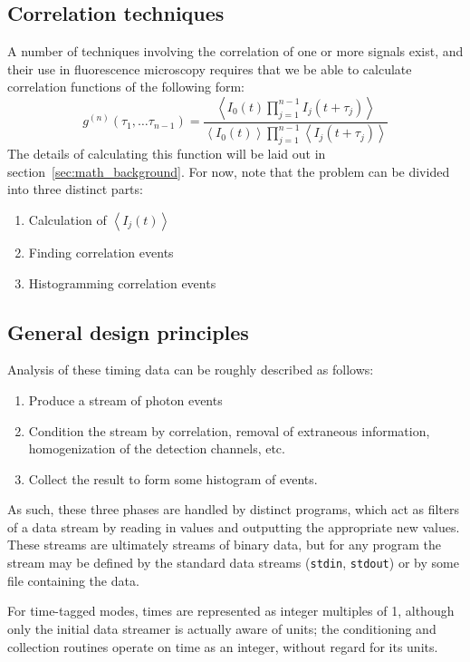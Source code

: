 \documentclass{article}
\newcommand{\angles}[1]{\ensuremath{\left\langle #1 \right\rangle}}
\newcommand{\stdin}{\texttt{stdin}}
\newcommand{\stdout}{\texttt{stdout}}
\newcommand{\gn}[1]{\ensuremath{g^{(#1)}}}
\begin{document}
\subsection{Correlation techniques}
A number of techniques involving the correlation of one or more signals exist, and their use in fluorescence microscopy requires that we be able to calculate correlation functions of the following form:
\begin{equation}
\gn{n}(\tau_{1}, \ldots \tau_{n-1}) = \frac
	{\angles{I_{0}(t)\prod_{j=1}^{n-1}{I_{j}(t+\tau_{j})}}}
	{\angles{I_{0}(t)}\prod_{j=1}^{n-1}{\angles{I_{j}(t+\tau_{j})}}}
\end{equation}
The details of calculating this function will be laid out in section~\ref{sec:math_background}. For now, note that the problem can be divided into three distinct parts:
\begin{enumerate}
\item Calculation of \angles{I_{j}(t)}
\item Finding correlation events
\item Histogramming correlation events
\end{enumerate}

\subsection{General design principles}
Analysis of these timing data can be roughly described as follows:
\begin{enumerate}
\item Produce a stream of photon events
\item Condition the stream by correlation, removal of extraneous information, homogenization of the detection channels, etc.
\item Collect the result to form some histogram of events.
\end{enumerate}
As such, these three phases are handled by distinct programs, which act as filters of a data stream by reading in values and outputting the appropriate new values. These streams are ultimately streams of binary data, but for any program the stream may be defined by the standard data streams (\stdin, \stdout) or by some file containing the data. 

For time-tagged modes, times are represented as integer multiples of 1\pico\second, although only the initial data streamer is actually aware of units; the conditioning and collection routines operate on time as an integer, without regard for its units.
\end{document}
